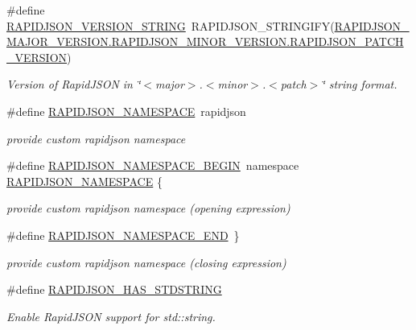 \begin{DoxyCompactItemize}
\#define \mbox{\hyperlink{group___r_a_p_i_d_j_s_o_n___c_o_n_f_i_g_gad283cfde97d9a32b7d8e8107b11f70a6}{R\+A\+P\+I\+D\+J\+S\+O\+N\+\_\+\+V\+E\+R\+S\+I\+O\+N\+\_\+\+S\+T\+R\+I\+NG}}~R\+A\+P\+I\+D\+J\+S\+O\+N\+\_\+\+S\+T\+R\+I\+N\+G\+I\+FY(\mbox{\hyperlink{group___r_a_p_i_d_j_s_o_n___c_o_n_f_i_g_gaf967d31be43666ce7f53756d73bd1cdf}{R\+A\+P\+I\+D\+J\+S\+O\+N\+\_\+\+M\+A\+J\+O\+R\+\_\+\+V\+E\+R\+S\+I\+O\+N.\+R\+A\+P\+I\+D\+J\+S\+O\+N\+\_\+\+M\+I\+N\+O\+R\+\_\+\+V\+E\+R\+S\+I\+O\+N.\+R\+A\+P\+I\+D\+J\+S\+O\+N\+\_\+\+P\+A\+T\+C\+H\+\_\+\+V\+E\+R\+S\+I\+ON}})
\begin{DoxyCompactList}\small\item\em Version of Rapid\+J\+S\+ON in \char`\"{}$<$major$>$.$<$minor$>$.$<$patch$>$\char`\"{} string format. \end{DoxyCompactList}\item 
\#define \mbox{\hyperlink{group___r_a_p_i_d_j_s_o_n___c_o_n_f_i_g_ga743a79d3af927391fe3eb5c979136899}{R\+A\+P\+I\+D\+J\+S\+O\+N\+\_\+\+N\+A\+M\+E\+S\+P\+A\+CE}}~rapidjson
\begin{DoxyCompactList}\small\item\em provide custom rapidjson namespace \end{DoxyCompactList}\item 
\#define \mbox{\hyperlink{group___r_a_p_i_d_j_s_o_n___c_o_n_f_i_g_gad3806c8251fdc7da9618b7e922674ffc}{R\+A\+P\+I\+D\+J\+S\+O\+N\+\_\+\+N\+A\+M\+E\+S\+P\+A\+C\+E\+\_\+\+B\+E\+G\+IN}}~namespace \mbox{\hyperlink{group___r_a_p_i_d_j_s_o_n___c_o_n_f_i_g_ga743a79d3af927391fe3eb5c979136899}{R\+A\+P\+I\+D\+J\+S\+O\+N\+\_\+\+N\+A\+M\+E\+S\+P\+A\+CE}} \{
\begin{DoxyCompactList}\small\item\em provide custom rapidjson namespace (opening expression) \end{DoxyCompactList}\item 
\#define \mbox{\hyperlink{group___r_a_p_i_d_j_s_o_n___c_o_n_f_i_g_gaf18f052a98b9f5df5448d39484b743c1}{R\+A\+P\+I\+D\+J\+S\+O\+N\+\_\+\+N\+A\+M\+E\+S\+P\+A\+C\+E\+\_\+\+E\+ND}}~\}
\begin{DoxyCompactList}\small\item\em provide custom rapidjson namespace (closing expression) \end{DoxyCompactList}\item 
\#define \mbox{\hyperlink{group___r_a_p_i_d_j_s_o_n___c_o_n_f_i_g_ga2f2eef0ee4477f3fe5874703a66e997f}{R\+A\+P\+I\+D\+J\+S\+O\+N\+\_\+\+H\+A\+S\+\_\+\+S\+T\+D\+S\+T\+R\+I\+NG}}
\begin{DoxyCompactList}\small\item\em Enable Rapid\+J\+S\+ON support for {\ttfamily std\+::string}. \end{DoxyCompactList}\item 

\end{DoxyCompactItemize}
